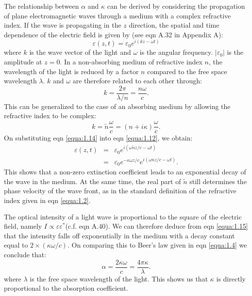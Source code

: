 \documentclass[12pt]{book}
\begin{document}
The relationship between $\alpha$ and $\kappa$ can be derived by considering the propagation of plane electromagnetic waves through a medium with a complex refractive index. If the wave is propagating in the $z$ direction, the spatial and time dependence of the electric field is given by (see eqn A.32 in Appendix A):
\begin{equation}\label{equa:1.12}
  \varepsilon(z,t)=\varepsilon_0e^{i(kz-\omega t)}
\end{equation}
where $k$ is the wave vector of the light and $\omega$ is the angular frequency. $|\varepsilon_0|$ is the amplitude at $z = 0$. In a non-absorbing medium of refractive index $n$, the wavelength of the light is reduced by a factor $n$ compared to the free space wavelength $\lambda$. $k$ and $\omega$ are therefore related to each other through:
\begin{equation}\label{equa:1.13}
  k=\frac{2\pi}{\lambda/n}=\frac{n\omega}{c}.
\end{equation}
This can be generalized to the case of an absorbing medium by allowing the refractive index to be complex:
\begin{equation}\label{equa:1.14}
  k=\tilde{n}\frac{\omega}{c}=(n+i\kappa)\frac{\omega}{c}.
\end{equation}
On substituting eqn \ref{equa:1.14} into eqn \ref{equa:1.12}, we obtain:
\begin{eqnarray}\label{equa:1.15}
\nonumber  \varepsilon(z,t) &=& \varepsilon_0e^{i(\omega\tilde{n}z/c-\omega t)} \\
&= &\varepsilon_0e^{-\kappa\omega z/c}e^{i(\omega nz/c-\omega t)}.
\end{eqnarray}
This shows that a non-zero extinction coefficient leads to an exponential decay of the wave in the medium. At the same time, the real part of $\tilde{n}$ still determines the phase velocity of the wave front, as in the standard definition of the refractive index given in eqn \ref{equa:1.2}.

The optical intensity of a light wave is proportional to the square of the electric field, namely $I\propto\varepsilon\varepsilon^*$(c.f. eqn A.40). We can therefore deduce from eqn \ref{equa:1.15} that the intensity falls off exponentially in the medium with a decay constant equal to $2\times(\kappa\omega/c)$. On comparing this to Beer's law given in eqn \ref{equa:1.4} we conclude that:
\begin{equation}\label{equa:1.16}
  \alpha=\frac{2\kappa\omega}{c}=\frac{4\pi\kappa}{\lambda}.
\end{equation}
where $\lambda$ is the free space wavelength of the light. This shows us that $\kappa$ is directly proportional to the absorption coefficient.
\end{document}
